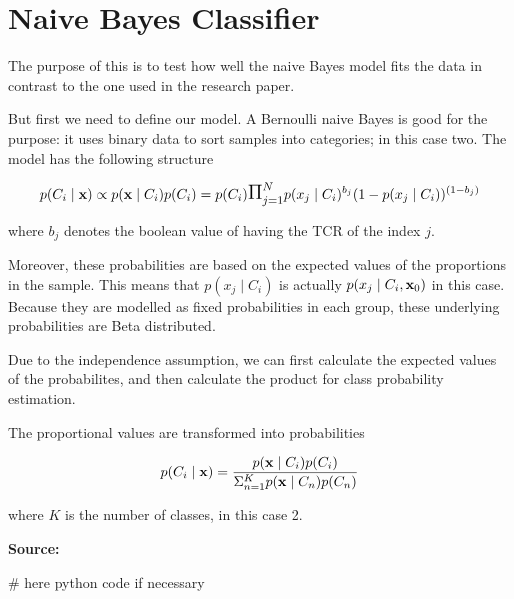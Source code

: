 \documentclass[a4paper,11pt]{article}
\begin{document}
\thispagestyle{empty}

\section*{Naive Bayes Classifier}


The purpose of this is to test how well the naive Bayes model fits the data in contrast to the one used in the research paper.

But first we need to define our model. A Bernoulli naive Bayes is good for the purpose: it uses binary data to sort samples into categories; in this case two. The model has the following structure

\[ p(C_i \mid {\bf x} ) \propto p({\bf x} \mid C_i ) p(C_i) = p(C_i)\mathlarger{\mathlarger{ \Pi }}_{j=1}^{N} p(x_j \mid C_i)^{b_j}(1 - p(x_j \mid C_i))^{(1-b_j)} \]

where $b_j$ denotes the boolean value of having the TCR of the index $j$. 

Moreover, these probabilities are based on the expected values of the proportions in the sample. This means that $p(x_j \mid C_i)$ is actually $p(x_j \mid C_i, {\bf x}_0)$ in this case. Because they are modelled as fixed probabilities in each group, these underlying probabilities are Beta distributed. 

Due to the independence assumption, we can first calculate the expected values of the probabilites, and then calculate the product for class probability estimation.

The proportional values are transformed into probabilities

\[ p(C_i \mid {\bf x} ) = \frac{p({\bf x} \mid C_i ) p(C_i) }{ \Sigma_{n=1}^K p({\bf x} \mid C_n ) p(C_n)} \]

where $K$ is the number of classes, in this case 2.

{\bf Source:}

\begin{python}
# here python code if necessary
\end{python}
\end{document}
